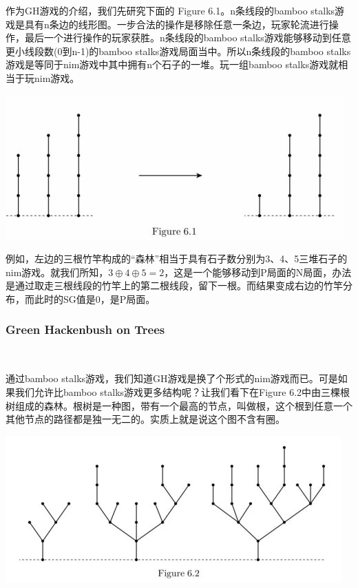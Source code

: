	作为GH游戏的介绍，我们先研究下面的 Figure 6.1。n条线段的bamboo stalks游戏是具有n条边的线形图。一步合法的操作是移除任意一条边，玩家轮流进行操作，最后一个进行操作的玩家获胜。n条线段的bamboo stalks游戏能够移动到任意更小线段数(0到n-1)的bamboo stalks游戏局面当中。所以n条线段的bamboo stalks游戏是等同于nim游戏中其中拥有n个石子的一堆。玩一组bamboo stalks游戏就相当于玩nim游戏。
	\begin{center}
	\includegraphics{./source/img5.jpeg}
	\end{center}
	
	例如，左边的三根竹竿构成的“森林”相当于具有石子数分别为3、4、5三堆石子的nim游戏。就我们所知，$3\oplus4\oplus5=2$，这是一个能够移动到P局面的N局面，办法是通过取走三根线段的竹竿上的第二根线段，留下一根。而结果变成右边的竹竿分布，而此时的SG值是0，是P局面。
	~\\
	\subsubsection{Green Hackenbush on Trees}~
	
	通过bamboo stalks游戏，我们知道GH游戏是换了个形式的nim游戏而已。可是如果我们允许比bamboo stalks游戏更多结构呢？让我们看下在Figure 6.2中由三棵根树组成的森林。根树是一种图，带有一个最高的节点，叫做根，这个根到任意一个其他节点的路径都是独一无二的。实质上就是说这个图不含有圈。
	\begin{center}
	\includegraphics{./source/img6.jpg}
	\end{center}
	
